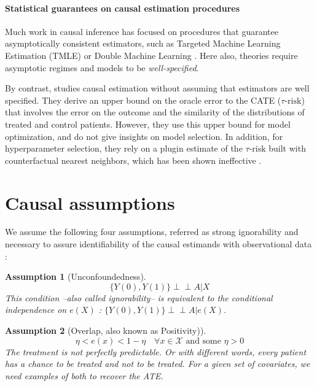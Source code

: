 \documentclass[10pt,twocolumn]{article}
\newcommand{\indep}{\perp \!\!\! \perp}
\newtheorem{assumption}{Assumption}
\begin{document}
\paragraph{Statistical guarantees on causal estimation procedures}

Much work in causal inference has focused on procedures that
guarantee asymptotically consistent estimators, such as Targeted
Machine Learning
Estimation (TMLE) \cite{laan_targeted_2011,schuler_targeted_2017} or
Double Machine Learning \cite{chernozhukov_double_2018}. Here also, theories require asymptotic regimes and
models to be \textit{well-specified}.

By contrast, \citet{johansson2022generalization} studies causal estimation
without assuming that estimators are well specified. They derive an upper bound
on the oracle error to the CATE ($\tau\text{-risk}$) that involves the error on
the outcome and the similarity of the distributions of treated and control
patients. However, they use this upper bound for model optimization,
and do not give insights on model selection. In addition, for hyperparameter
selection, they rely on a plugin estimate of the $\tau\text{-risk}$ built with
counterfactual nearest neighbors, which has been shown ineffective
\cite{schuler_comparison_2018}.


\section{Causal assumptions}\label{apd:causal_assumptions}

We assume the following four assumptions, referred as strong ignorability and
necessary to assure identifiability of the causal estimands with observational
data \cite{rubin_causal_2005}:
\begin{assumption}[Unconfoundedness]\label{assumption:ignorability}
    \begin{equation*}\label{eq:ignorability}
        \{Y(0), Y(1) \} \indep A | X
    \end{equation*}
    This condition --also called ignorability-- is equivalent to the conditional
    independence on $e(X)$ \cite{rosenbaum_central_1983}: $\{Y(0), Y(1) \}
        \indep  A | e(X)$.
\end{assumption}


\begin{assumption}[Overlap, also known as Positivity)]\label{assumption:overlap}
    \begin{equation*}\label{eq:overlap}
        \eta < e(x) < 1 - \eta \quad \forall x \in \mathcal X \text{ and some } \eta > 0
    \end{equation*}
    The treatment is not perfectly predictable. Or with different words, every
    patient has a chance to be treated and not to be treated. For a given set of
    covariates, we need examples of both to recover the ATE.
\end{assumption}
\end{document}
